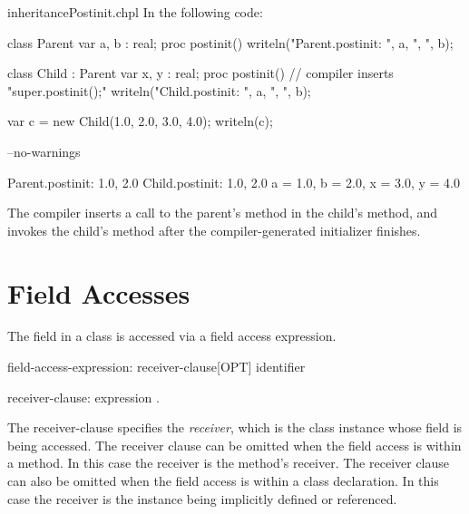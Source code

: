 \begin{chapelexample}{inheritancePostinit.chpl}
In the following code:
\begin{chapel}
class Parent {
  var a, b : real;
  proc postinit() {
    writeln("Parent.postinit: ", a, ", ", b);
  }
}

class Child : Parent {
  var x, y : real;
  proc postinit() {
    // compiler inserts "super.postinit();"
    writeln("Child.postinit: ", a, ", ", b);
  }
}

var c = new Child(1.0, 2.0, 3.0, 4.0);
writeln(c);
\end{chapel}
\begin{chapelcompopts}
--no-warnings
\end{chapelcompopts}
\begin{chapelprintoutput}
Parent.postinit: 1.0, 2.0
Child.postinit: 1.0, 2.0
{a = 1.0, b = 2.0, x = 3.0, y = 4.0}
\end{chapelprintoutput}
The compiler inserts a call to the parent's  method in the
child's  method, and invokes the child's  method
after the compiler-generated initializer finishes.
\end{chapelexample}

\section{Field Accesses}
\label{Class_Field_Accesses}

The field in a class is accessed via a field access expression.

\begin{syntax}
field-access-expression:
  receiver-clause[OPT] identifier

receiver-clause:
  expression .
\end{syntax}

The receiver-clause specifies the \emph{receiver}, which is the class
instance whose field is being accessed.
The receiver clause can be omitted when the field access is within a method.
In this case the receiver is the method's receiver.
The receiver clause can also be omitted when the field access is within
a class declaration. In this case the receiver is the instance
being implicitly defined or referenced.

